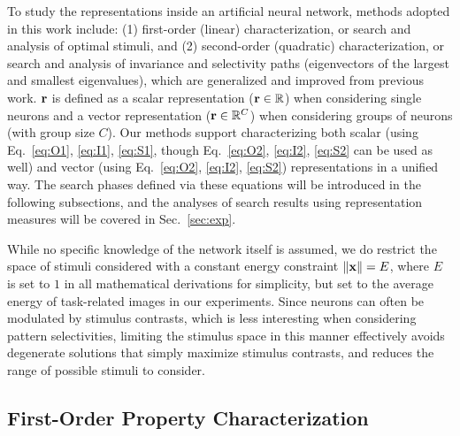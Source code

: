 \documentclass[10pt,twocolumn,letterpaper]{article}
\begin{document}
To study the representations inside an artificial neural network, methods adopted in this work include: (1) first-order (\ie linear) characterization, or search and analysis of optimal stimuli, and (2) second-order (\ie quadratic) characterization, or search and analysis of invariance and selectivity paths (\ie eigenvectors of the largest and smallest eigenvalues), which are generalized and improved from previous work.
$\bf{r}$ is defined as a scalar representation (\ie $\bf{r} \in \mathbb{R}$) when considering single neurons and a vector representation (\ie ${\bf{r}} \in \mathbb{R}^C$) when considering groups of neurons (with group size $C$).
Our methods support characterizing both scalar (using Eq.~\ref{eq:O1}, \ref{eq:I1}, \ref{eq:S1}, though Eq.~\ref{eq:O2}, \ref{eq:I2}, \ref{eq:S2} can be used as well) and vector (using Eq.~\ref{eq:O2}, \ref{eq:I2}, \ref{eq:S2}) representations in a unified way.
The search phases defined via these equations will be introduced in the following subsections, and the analyses of search results using representation measures will be covered in Sec.~\ref{sec:exp}.


While no specific knowledge of the network itself is assumed, we do restrict the space of stimuli considered with a constant energy constraint $\left\| \bf{x} \right\| = E$, where $E$ is set to $1$ in all mathematical derivations for simplicity, but set to the average energy of task-related images in our experiments.
Since neurons can often be modulated by stimulus contrasts, which is less interesting when considering pattern selectivities, limiting the stimulus space in this manner effectively avoids degenerate solutions that simply maximize stimulus contrasts, and reduces the range of possible stimuli to consider.


\subsection{First-Order Property Characterization}
\end{document}
